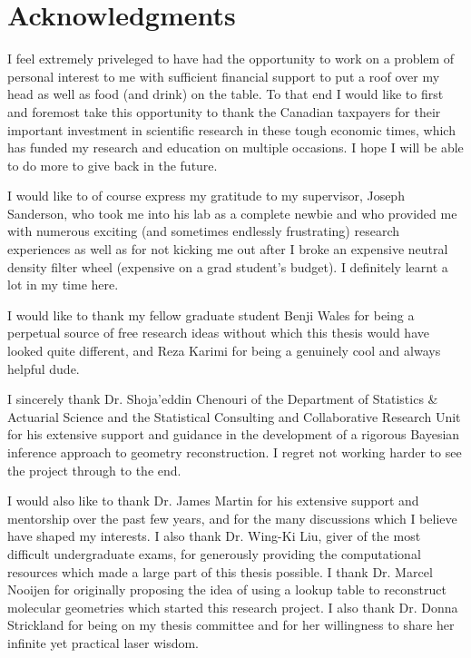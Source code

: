 
\begingroup
\let\clearpage\relax
\let\cleardoublepage\relax
\let\cleardoublepage\relax
\chapter*{Acknowledgments}
I feel extremely priveleged to have had the opportunity to work on a problem of personal interest to me with sufficient financial support to put a roof over my head as well as food (and drink) on the table. To that end I would like to first and foremost take this opportunity to thank the Canadian taxpayers for their important investment in scientific research in these tough economic times, which has funded my research and education on multiple occasions. I hope I will be able to do more to give back in the future.

I would like to of course express my gratitude to my supervisor, Joseph Sanderson, who took me into his lab as a complete newbie and who provided me with numerous exciting (and sometimes endlessly frustrating) research experiences as well as for not kicking me out after I broke an expensive neutral density filter wheel (expensive on a grad student's budget). I definitely learnt a lot in my time here.

I would like to thank my fellow graduate student Benji Wales for being a perpetual source of free research ideas without which this thesis would have looked quite different, and Reza Karimi for being a genuinely cool and always helpful dude.

I sincerely thank Dr. Shoja'eddin Chenouri of the Department of Statistics \& Actuarial Science and the Statistical Consulting and Collaborative Research Unit for his extensive support and guidance in the development of a rigorous Bayesian inference approach to geometry reconstruction. I regret not working harder to see the project through to the end.

I would also like to thank Dr. James Martin for his extensive support and mentorship over the past few years, and for the many discussions which I believe have shaped my interests. I also thank Dr. Wing-Ki Liu, giver of the most difficult undergraduate exams, for generously providing the computational resources which made a large part of this thesis possible. I thank Dr. Marcel Nooijen for originally proposing the idea of using a lookup table to reconstruct molecular geometries which started this research project. I also thank Dr. Donna Strickland for being on my thesis committee and for her willingness to share her infinite yet practical laser wisdom.


